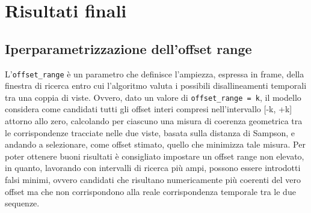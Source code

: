 \graphicspath{{chapters/chapter5/img}}
\chapter{Risultati finali} \label{risultati}

\section{Iperparametrizzazione dell'offset range}
\begin{flushleft}
L'\texttt{offset\_range} è un parametro che definisce l'ampiezza, espressa in frame, della finestra di ricerca entro cui l'algoritmo valuta i possibili disallineamenti temporali tra una coppia di viste. Ovvero, dato un valore di \texttt{offset\_range = k}, il modello considera come candidati tutti gli offset interi compresi nell'intervallo [-k, +k] attorno allo zero, calcolando per ciascuno una misura di coerenza geometrica tra le corrispondenze tracciate nelle due viste, basata sulla distanza di Sampson, e andando a selezionare, come offset stimato, quello che minimizza tale misura.
Per poter ottenere buoni risultati è consigliato impostare un offset range non elevato, in quanto, lavorando con intervalli di ricerca più ampi, possono essere introdotti falsi minimi, ovvero candidati che risultano numericamente più coerenti del vero offset ma che non corrispondono alla reale corrispondenza temporale tra le due sequenze.
\end{flushleft}

